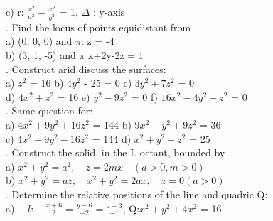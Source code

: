\documentclass[11pts]{amsbook}
\begin{document}

c) r: $\frac{x^{2}}{a^{2}} - \frac{x^{2}}{b^{2}}$ = 1, \hspace{30pt} $\Delta$ : y-axis \\

. Find the locus of points equidistant from \\

\indent a) (0, 0, 0) and $\pi$: z = -4 \\
\indent b) (3, 1, -5) and $\pi$ x+2y-2z = 1 \\

. Construct arid discuss the surfaces: \\

\indent a) $z^{2}$ = 16 \hspace{30pt} b) $4y^{2}$ - 25 = 0 \hspace{30pt} c) $3y^{2} + 7z^{2}$ = 0 \\

\indent d) $4x^{2}+z^{2}$ = 16 \hspace{3pt} e) $y^{2}-9z^{2}$ = 0 \hspace{29pt} f) $16x^{2}-4y^{2}-z^{2}$ = 0 \\

. Same question for:  \\

\indent a) $4x^{2}+9y^{2}+16z^{2}$ = 144 \hspace{30pt} b) $9x^{2}-y^{2}+9z^{2}$ = 36 \\

\indent c) $4x^{2}-9y^{2}-16z^{2}$ = 144 \hspace{30pt} d)  $x^{2}+y^{2}-z^{2}$ = 25 \\

. Construct the solid, in the I. octant, bounded by \\

\indent a) $x^{2}+y^{2} = a^{2},\quad z = 2mx \quad (a>0, m>0)$ \\

\indent b) $x^{2}+y^{2} = az,\quad x^{2}+y^{2} = 2ax, \quad z=0 (a>0)$ \\

. Determine the relative positions of the line and quadric Q: \\

\indent a) $\quad\mathit{l}:\quad \frac{x+6}{2}=\frac{y-6}{-2}=\frac{z-3}{-1}$, Q:$x^{2}+y^{2}+4x^{2}$ = 16 \\
\end{document}
